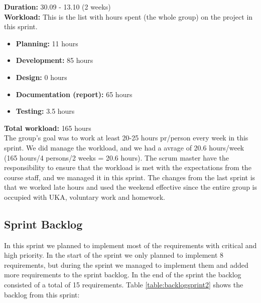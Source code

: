 	{\bf Duration:} 30.09 - 13.10 (2 weeks)\\
	{\bf Workload:} This is the list with hours spent (the whole group) on the project in this sprint.
	\begin{itemize}
		\item {\bf Planning:} 11 hours
		\item {\bf Development:} 85 hours
		\item {\bf Design:} 0 hours
		\item {\bf Documentation (report):} 65 hours
		\item {\bf Testing:} 3.5 hours
	\end{itemize}
	{\bf Total workload: } 165 hours \\

	The group's goal was to work at least 20-25 hours pr/person every week in this sprint. 
	We did manage the workload, and we had a avrage of 20.6 hours/week (165 hours/4 persons/2 weeks = 20.6 hours). 
	The scrum master have the responsibility to ensure that the workload is met with the
	expectations from the course staff, and we managed it in this sprint.
	The changes from the last sprint is that we worked late hours and used the weekend effective
	since the entire group is occupied with UKA, voluntary work and homework.

\subsection{Sprint Backlog}

	In this sprint we planned to implement most of the requirements with critical and high
	priority. In the start of the sprint we only planned to implement 8 requirements, but
	during the sprint we managed to implement them and added more requirements to the sprint backlog.
	In the end of the sprint the backlog consisted of a total of 15 requirements. Table \ref{table:backlogsprint2} shows the backlog from this sprint:

